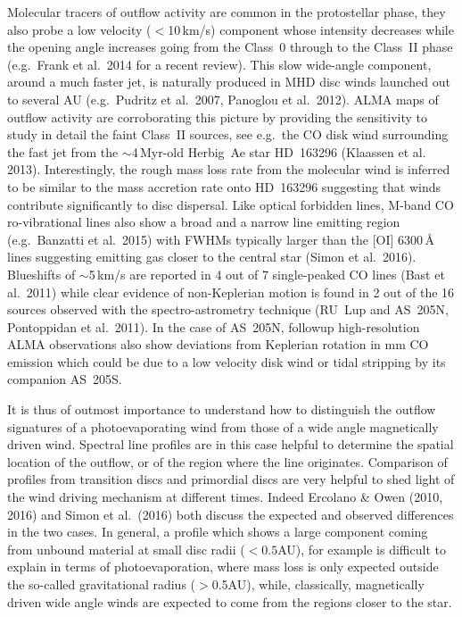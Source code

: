 \documentclass[10pt,fleqn,twoside]{article}
\begin{document}
Molecular tracers of outflow activity are common in the protostellar
phase, they also probe a low velocity ($<$10\,km/s) component whose
intensity decreases while the opening angle increases going from the
Class~0 through to the Class~II phase (e.g.\ Frank et al.\ 2014 for a
recent review). This slow wide-angle component, around a much faster
jet, is naturally produced in MHD disc winds launched out to several
AU (e.g.\ Pudritz et al.\ 2007, Panoglou et al.\ 2012). ALMA maps of
outflow activity are corroborating this picture by providing the
sensitivity to study in detail the faint Class~II sources, see
e.g.\ the CO disk wind surrounding the fast jet from the
$\sim$4\,Myr-old Herbig~Ae star HD~163296 (Klaassen et
al. 2013). Interestingly, the rough mass loss rate from the molecular
wind is inferred to be similar to the mass accretion rate onto
HD~163296 suggesting that winds contribute significantly to disc
dispersal. Like optical forbidden lines, M-band CO ro-vibrational
lines also show a broad and a narrow line emitting region
(e.g.\ Banzatti et al.\ 2015) with FWHMs typically larger than the [OI]
6300\,\AA{} lines suggesting emitting gas closer to the central star
(Simon et al.\ 2016). Blueshifts of $\sim$5\,km/s are reported in 4 out
of  7 single-peaked CO lines (Bast et al.\ 2011) while clear evidence
of non-Keplerian motion is found in 2 out of the 16 sources observed
with the spectro-astrometry technique (RU~Lup and AS~205N, Pontoppidan
et al.\ 2011). In the case of AS~205N, followup high-resolution ALMA
observations also show deviations from Keplerian rotation in mm CO
emission which could be due to a low velocity disk wind or tidal
stripping by its companion AS~205S. 

It is thus of outmost importance to understand how to distinguish the
outflow signatures of a photoevaporating wind from those of a wide
angle magnetically driven wind. Spectral line profiles are in this
case helpful to determine the spatial location of the outflow, or of
the region where the line originates. Comparison of profiles from
transition discs and primordial discs are very helpful to shed light
of the wind driving mechanism at different times. Indeed Ercolano \&
Owen (2010, 2016) and Simon et al.\ (2016) both discuss the expected
and observed differences in the two cases. In general, a profile which
shows a large component coming from unbound material at small disc
radii ($<0.5$AU), for example is difficult to explain in terms of
photoevaporation, where mass loss is only expected outside the
so-called gravitational radius ($>$0.5AU), while, classically,
magnetically driven wide angle winds are expected to come from the
regions closer to the star. 
\end{document}

